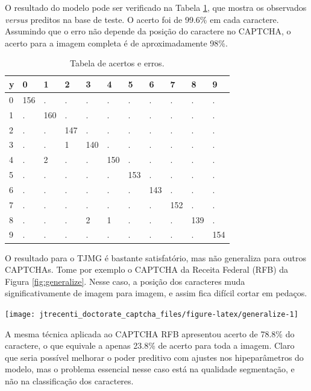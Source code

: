 \documentclass[12pt,]{report}
\let\origfigure\figure
\let\endorigfigure\endfigure
\renewenvironment{figure}[1][2] {
    \expandafter\origfigure\expandafter[H]
} {
    \endorigfigure
}
\begin{document}
O resultado do modelo pode ser verificado na Tabela \ref{tab:errosTJMG},
que mostra os observados \emph{versus} preditos na base de teste. O
acerto foi de 99.6\% em cada caractere. Assumindo que o erro não depende
da posição do caractere no CAPTCHA, o acerto para a imagem completa é de
aproximadamente 98\%.

\begin{table}

\caption{\label{tab:errosTJMG}Tabela de acertos e erros.}
\centering
\begin{tabular}[t]{l|l|l|l|l|l|l|l|l|l|l}
\hline
y & 0 & 1 & 2 & 3 & 4 & 5 & 6 & 7 & 8 & 9\\
\hline
0 & 156 & . & . & . & . & . & . & . & . & .\\
\hline
1 & . & 160 & . & . & . & . & . & . & . & .\\
\hline
2 & . & . & 147 & . & . & . & . & . & . & .\\
\hline
3 & . & . & 1 & 140 & . & . & . & . & . & .\\
\hline
4 & . & 2 & . & . & 150 & . & . & . & . & .\\
\hline
5 & . & . & . & . & . & 153 & . & . & . & .\\
\hline
6 & . & . & . & . & . & . & 143 & . & . & .\\
\hline
7 & . & . & . & . & . & . & . & 152 & . & .\\
\hline
8 & . & . & . & 2 & 1 & . & . & . & 139 & .\\
\hline
9 & . & . & . & . & . & . & . & . & . & 154\\
\hline
\end{tabular}
\end{table}

O resultado para o TJMG é bastante satisfatório, mas não generaliza para
outros CAPTCHAs. Tome por exemplo o CAPTCHA da Receita Federal (RFB) da
Figura \ref{fig:generalize}. Nesse caso, a posição dos caracteres muda
significativamente de imagem para imagem, e assim fica difícil cortar em
pedaços.

\begin{figure}

{\centering \texttt{[image: jtrecenti\_doctorate\_captcha\_files/figure-latex/generalize-1]} 

}

\caption{CAPTCHA Receita Federal}\label{fig:generalize}
\end{figure}

A mesma técnica aplicada ao CAPTCHA RFB apresentou acerto de 78.8\% do
caractere, o que equivale a apenas 23.8\% de acerto para toda a imagem.
Claro que seria possível melhorar o poder preditivo com ajustes nos
hipeparâmetros do modelo, mas o problema essencial nesse caso está na
qualidade segmentação, e não na classificação dos caracteres.
\end{document}
